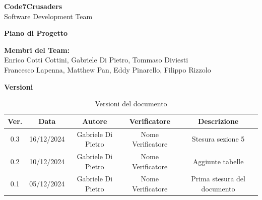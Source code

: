 \documentclass{article}
\begin{document}
\begin{titlepage}
    {\Huge \textbf{Code7Crusaders}}\\
    \vspace{0.5cm}
    {\Large Software Development Team}\\
    \vspace{2cm}
    
    {\large \textbf{Piano di Progetto}}\\
    \vspace{5cm}
    
    
    \textbf{Membri del Team:}\\
    Enrico Cotti Cottini, Gabriele Di Pietro, Tommaso Diviesti \\
    Francesco Lapenna, Matthew Pan, Eddy Pinarello, Filippo Rizzolo \\
    \vspace{0.5cm}
    
    \vspace{1cm}
\end{titlepage}



\begin{table}[h!]
\centering
\textbf{Versioni} \\ %
\vspace{2mm} %
\begin{tabular}{|c|c|c|c|c|}
    \hline
    \textbf{Ver.} & \textbf{Data} & \textbf{Autore} & \textbf{Verificatore} & \textbf{Descrizione} \\
    \hline
    0.3 & 16/12/2024 & Gabriele Di Pietro & Nome Verificatore & Stesura sezione 5 \\
    0.2 & 10/12/2024 & Gabriele Di Pietro & Nome Verificatore & Aggiunte tabelle \\
    0.1 & 05/12/2024 & Gabriele Di Pietro & Nome Verificatore & Prima stesura del documento \\  
    \hline
\end{tabular}
\caption{Versioni del documento}
\label{tab:versioni}
\end{table}



\tableofcontents
\end{document}
